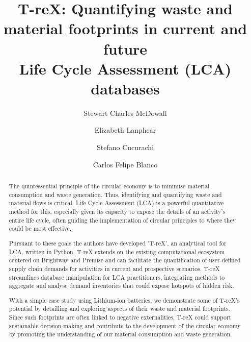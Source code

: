 \documentclass[a4paper,fleqn,longmktitle]{cas-dc}
\begin{document}
\let\WriteBookmarks\relax
\def\floatpagepagefraction{1}
\def\textpagefraction{.001}



\title [mode = title]{T-reX\@: Quantifying waste and material footprints in current and future \\ Life Cycle Assessment (LCA) databases}  

\author[1]{Stewart Charles McDowall}
\cormark[1]

\author[1]{Elizabeth Lanphear}

\author[1]{Stefano Cucurachi}

\author[1]{Carlos Felipe Blanco}



\begin{abstract}
	
The quintessential principle of the circular economy is to minimise material consumption and waste generation. Thus, identifying and quantifying waste and material flows is critical. Life Cycle Assessment (LCA) is a powerful quantitative method for this, especially given its capacity to expose the details of an activity's entire life cycle, often guiding the implementation of circular principles to where they could be most effective.

Pursuant to these goals the authors have developed 'T-reX', an analytical tool for LCA, written in Python. T-reX extends on the existing computational ecosystem centered on Brightway and Premise and can facilitate the quantification of user-defined supply chain demands for activities in current and prospective scenarios. T-reX streamlines database manipulation for LCA practitioners, integrating methods to aggregate and analyse demand inventories that could expose hotspots of hidden risk.

With a simple case study using Lithium-ion batteries, we demonstrate some of T-reX's potential by detailling and exploring aspects of their waste and material footprints. Since such footprints are often linked to negative externalities, T-reX could support sustainable decision-making and contribute to the development of the circular economy by promoting the understanding of our material consumption and waste generation.

\end{abstract}
\end{document}
